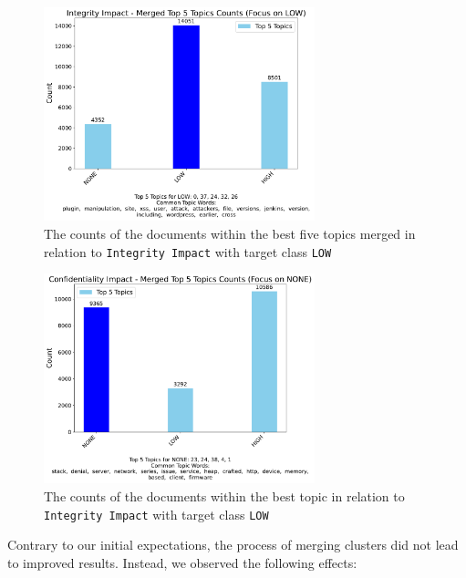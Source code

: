 \documentclass[12pt]{article}
\begin{document}
\begin{figure}[H]
	\centering
	\includegraphics[width=0.7\textwidth]{figures/integrityImpact/merged_top_k_topics_category_focus_counts_integrityImpact_LOW_k5.pdf}
	\caption{The counts of the documents within the best five topics merged in relation to \texttt{Integrity
			Impact} with
		target class \texttt{LOW}}

	\label{fig:integrityImpact_60_NONE_merged}
\end{figure}

\begin{figure}[ht]
	\centering
	\includegraphics[width=0.7\textwidth]{figures/confidentialityImpact/merged_top_k_topics_category_focus_counts_confidentialityImpact_NONE_k5.pdf}
	\caption{The counts of the documents within the best topic in relation to \texttt{Integrity Impact} with target class \texttt{LOW}}
	\label{fig:confidentialityImpact_60_LOW_merged}
\end{figure}

Contrary to our initial expectations, the process of merging clusters did not lead to improved
results. Instead, we observed the following effects:
\end{document}
